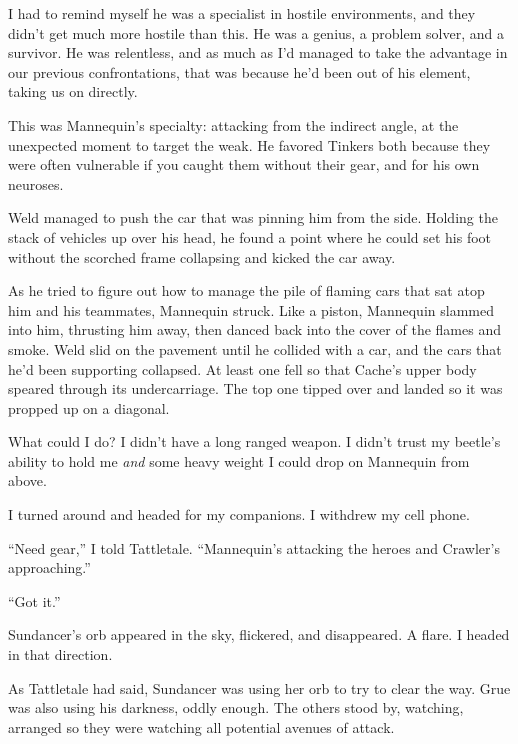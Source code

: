 I had to remind myself he was a specialist in hostile environments, and they didn't get much more hostile than this.  He was a genius, a problem solver, and a survivor.  He was relentless, and as much as I'd managed to take the advantage in our previous confrontations, that was because he'd been out of his element, taking us on directly.



This was Mannequin's specialty: attacking from the indirect angle, at the unexpected moment to target the weak.  He favored Tinkers both because they were often vulnerable if you caught them without their gear, and for his own neuroses.



Weld managed to push the car that was pinning him from the side.  Holding the stack of vehicles up over his head, he found a point where he could set his foot without the scorched frame collapsing and kicked the car away.



As he tried to figure out how to manage the pile of flaming cars that sat atop him and his teammates, Mannequin struck.  Like a piston, Mannequin slammed into him, thrusting him away, then danced back into the cover of the flames and smoke.  Weld slid on the pavement until he collided with a car, and the cars that he'd been supporting collapsed.  At least one fell so that Cache's upper body speared through its undercarriage.  The top one tipped over and landed so it was propped up on a diagonal.



What could I do?  I didn't have a long ranged weapon.  I didn't trust my beetle's ability to hold me \emph{and} some heavy weight I could drop on Mannequin from above.



I turned around and headed for my companions.  I withdrew my cell phone.



``Need gear,'' I told Tattletale.  ``Mannequin's attacking the heroes and Crawler's approaching.''



``Got it.''



Sundancer's orb appeared in the sky, flickered, and disappeared.  A flare.  I headed in that direction.



As Tattletale had said, Sundancer was using her orb to try to clear the way.  Grue was also using his darkness, oddly enough.  The others stood by, watching, arranged so they were watching all potential avenues of attack.



